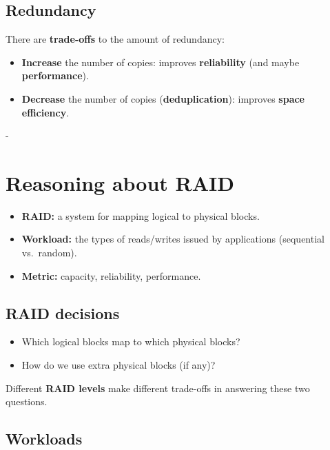 \documentclass[11pt,a4paper]{article}
\makeatletter
\newcommand{\keepspace}[1]{\par\penalty-100\begingroup
  \setlength{\dimen@}{#1}\dimen@ii\pagegoal\advance\dimen@ii-\pagetotal
  \ifdim\dimen@>\dimen@ii\ifdim\dimen@ii>\z@\vfil\fi\break\fi\endgroup}
\makeatother
\begin{document}
\subsection{Redundancy}

There are \textbf{trade-offs} to the amount of redundancy:
\begin{itemize}
  \item \textbf{Increase} the number of copies: improves
        \textbf{reliability} (and maybe \textbf{performance}).
  \item \textbf{Decrease} the number of copies (\textbf{deduplication}):
        improves \textbf{space efficiency}.
\end{itemize}

\keepspace{9\baselineskip}
\section{Reasoning about RAID}

\begin{defbox}
\begin{itemize}
  \item \textbf{RAID:} a system for mapping logical to physical blocks.
  \item \textbf{Workload:} the types of reads/writes issued by applications
        (sequential vs.\ random).
  \item \textbf{Metric:} capacity, reliability, performance.
\end{itemize}
\end{defbox}

\subsection{RAID decisions}

\begin{itemize}
  \item Which logical blocks map to which physical blocks?
  \item How do we use extra physical blocks (if any)?
\end{itemize}
Different \textbf{RAID levels} make different trade-offs in answering these
two questions.

\subsection{Workloads}
\end{document}
